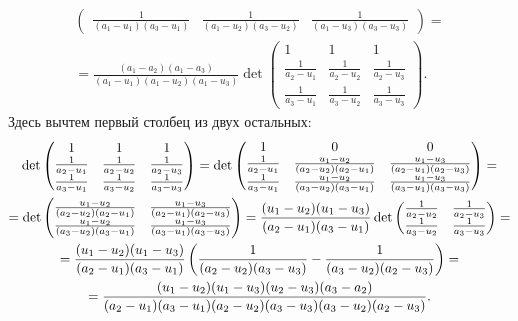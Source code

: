 \begin{solution}
\begin{enumerate}[nolistsep, label=(\arabic*)]
\begin{multline*}
\begin{pmatrix}
					\frac{1}{(a_1 - u_1)(a_3 - u_1)} & \frac{1}{(a_1 - u_2)(a_3 - u_2)} & \frac{1}{(a_1 - u_3)(a_3 - u_3)}
				\end{pmatrix} =\\ =
				\frac{(a_1 - a_2)(a_1 - a_3)}{(a_1 - u_1)(a_1 - u_2)(a_1 - u_3)}\det
				\begin{pmatrix}
					1 & 1 & 1\\
					\frac{1}{a_2 - u_1} & \frac{1}{a_2 - u_2} & \frac{1}{a_2 - u_3}\\
					\frac{1}{a_3 - u_1} & \frac{1}{a_3 - u_2} & \frac{1}{a_3 - u_3}
				\end{pmatrix}.
			\end{multline*}
			Здесь вычтем первый столбец из двух остальных:
			\begin{multline*}
				\det\begin{pmatrix}
					1 & 1 & 1\\
					\frac{1}{a_2 - u_1} & \frac{1}{a_2 - u_2} & \frac{1}{a_2 - u_3}\\
					\frac{1}{a_3 - u_1} & \frac{1}{a_3 - u_2} & \frac{1}{a_3 - u_3}
				\end{pmatrix} = \det
				\begin{pmatrix}
					1 & 0 & 0\\
					\frac{1}{a_2 - u_1} & \frac{u_1 - u_2}{(a_2 - u_2)(a_2 - u_1)} & \frac{u_1 - u_3}{(a_2 - u_1)(a_2 - u_3)}\\
					\frac{1}{a_3 - u_1} & \frac{u_1 - u_2}{(a_3 - u_2)(a_3 - u_1)} & \frac{u_1 - u_3}{(a_3 - u_1)(a_3 - u_3)}
				\end{pmatrix} =\\ = \det
				\begin{pmatrix}
					\frac{u_1 - u_2}{(a_2 - u_2)(a_2 - u_1)} & \frac{u_1 - u_3}{(a_2 - u_1)(a_2 - u_3)}\\
					\frac{u_1 - u_2}{(a_3 - u_2)(a_3 - u_1)} & \frac{u_1 - u_3}{(a_3 - u_1)(a_3 - u_3)}
				\end{pmatrix} = \frac{(u_1 - u_2)(u_1 - u_3)}{(a_2 - u_1)(a_3 - u_1)}\det
				\begin{pmatrix}
					\frac{1}{a_2 - u_2} & \frac{1}{a_2 - u_3}\\
					\frac{1}{a_3 - u_2} & \frac{1}{a_3 - u_3}
				\end{pmatrix} =\\ =
				\frac{(u_1 - u_2)(u_1 - u_3)}{(a_2 - u_1)(a_3 - u_1)}\left(\frac{1}{(a_2 - u_2)(a_3 - u_3)} - \frac{1}{(a_3 - u_2)(a_2 - u_3)}\right) =\\ = \frac{(u_1 - u_2)(u_1 - u_3)(u_2 - u_3)(a_3 - a_2)}{(a_2 - u_1)(a_3 - u_1)(a_2 - u_2)(a_3 - u_3)(a_3 - u_2)(a_2 - u_3)}.
			\end{multline*}


\end{enumerate}
\end{solution}
